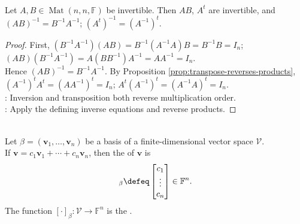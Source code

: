 \begin{corollary} \label{cor:matrix-inverse-product-and-transpose} \\
Let $A,B\in\operatorname{Mat}(n,n,\mathbb{F})$ be invertible. Then $AB$, $A^t$ are invertible, and $(AB)^{-1}=B^{-1}A^{-1}$; $(A^t)^{-1}=(A^{-1})^t$.
\begin{proof}
First, $(B^{-1}A^{-1})(AB)=B^{-1}(A^{-1}A)B=B^{-1}B=I_n$; $(AB)(B^{-1}A^{-1})=A(BB^{-1})A^{-1}=AA^{-1}=I_n$.\\
Hence $(AB)^{-1}=B^{-1}A^{-1}$. By Proposition \ref{prop:transpose-reverses-products}, $(A^{-1})^tA^t=(AA^{-1})^t=I_n$; $A^t(A^{-1})^t=(A^{-1}A)^t=I_n$.\\
: Inversion and transposition both reverse multiplication order.\\
: Apply the defining inverse equations and reverse products.
\end{proof}
\end{corollary}

\begin{definition} \\
Let $\beta=(\mathbf{v}_1,\ldots,\mathbf{v}_n)$ be a basis of a finite-dimensional vector space $\mathcal{V}$.\\
If $\mathbf{v}=c_1\mathbf{v}_1+\cdots+c_n\mathbf{v}_n$, then the  of $\mathbf{v}$ is
\begin{align}
[\mathbf{v}]_{\beta}\defeq
\begin{bmatrix}
c_1\\
\vdots\\
c_n
\end{bmatrix}
\in\mathbb{F}^n. \nonumber
\end{align}
The function $[\cdot]_{\beta}:\mathcal{V}\to\mathbb{F}^n$ is the .
\end{definition}

